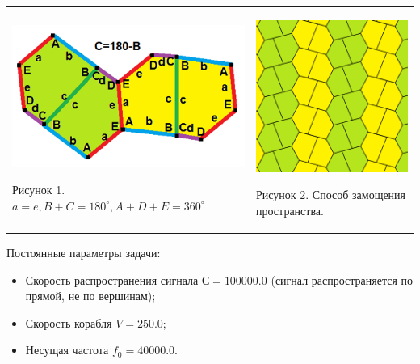 \begin{tabular}{p{7cm}p{7cm}}
    \includegraphics{2}

    Рисунок 1. $a = e, B + C = 180^\circ, A + D + E = 360^\circ$ & 
    \includegraphics{1}

    Рисунок 2. Способ замощения пространства.
        
\end{tabular}

Постоянные параметры задачи:
\begin{itemize}
    \item Скорость распространения сигнала $С = 100000.0$ (сигнал распространяется по прямой, не по вершинам);
    \item Скорость корабля $V = 250.0$;
    \item Несущая частота $f_0= 40000.0$.
\end{itemize}



